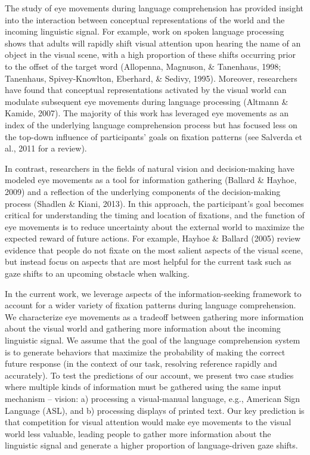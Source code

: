 \documentclass[10pt, letterpaper]{article}
\begin{document}
The study of eye movements during language comprehension has provided
insight into the interaction between conceptual representations of the
world and the incoming linguistic signal. For example, work on spoken
language processing shows that adults will rapidly shift visual
attention upon hearing the name of an object in the visual scene, with a
high proportion of these shifts occurring prior to the offset of the
target word (Allopenna, Magnuson, \& Tanenhaus, 1998; Tanenhaus,
Spivey-Knowlton, Eberhard, \& Sedivy, 1995). Moreover, researchers have
found that conceptual representations activated by the visual world can
modulate subsequent eye movements during language processing (Altmann \&
Kamide, 2007). The majority of this work has leveraged eye movements as
an index of the underlying language comprehension process but has
focused less on the top-down influence of participants' goals on
fixation patterns (see Salverda et al., 2011 for a review).

In contrast, researchers in the fields of natural vision and
decision-making have modeled eye movements as a tool for information
gathering (Ballard \& Hayhoe, 2009) and a reflection of the underlying
components of the decision-making process (Shadlen \& Kiani, 2013). In
this approach, the participant's goal becomes critical for understanding
the timing and location of fixations, and the function of eye movements
is to reduce uncertainty about the external world to maximize the
expected reward of future actions. For example, Hayhoe \& Ballard (2005)
review evidence that people do not fixate on the most salient aspects of
the visual scene, but instead focus on aspects that are most helpful for
the current task such as gaze shifts to an upcoming obstacle when
walking.

In the current work, we leverage aspects of the information-seeking
framework to account for a wider variety of fixation patterns during
language comprehension. We characterize eye movements as a tradeoff
between gathering more information about the visual world and gathering
more information about the incoming linguistic signal. We assume that
the goal of the language comprehension system is to generate behaviors
that maximize the probability of making the correct future response (in
the context of our task, resolving reference rapidly and accurately). To
test the predictions of our account, we present two case studies where
multiple kinds of information must be gathered using the same input
mechanism -- vision: a) processing a visual-manual language, e.g.,
American Sign Language (ASL), and b) processing displays of printed
text. Our key prediction is that competition for visual attention would
make eye movements to the visual world less valuable, leading people to
gather more information about the linguistic signal and generate a
higher proportion of language-driven gaze shifts.
\end{document}
